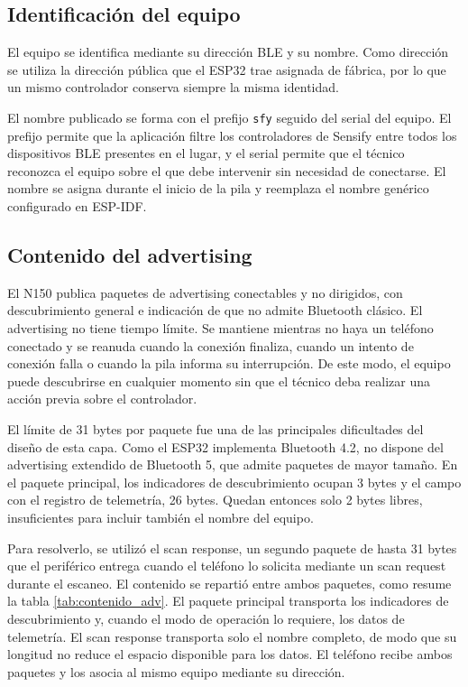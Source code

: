 \subsection{Identificación del equipo}
\label{subsec:gap_identificacion}

El equipo se identifica mediante su dirección BLE y su nombre. Como dirección se utiliza la dirección pública que el ESP32 trae asignada de fábrica, por lo que un mismo controlador conserva siempre la misma identidad.

El nombre publicado se forma con el prefijo \texttt{sfy} seguido del serial del equipo. El prefijo permite que la aplicación filtre los controladores de Sensify entre todos los dispositivos BLE presentes en el lugar, y el serial permite que el técnico reconozca el equipo sobre el que debe intervenir sin necesidad de conectarse. El nombre se asigna durante el inicio de la pila y reemplaza el nombre genérico configurado en ESP-IDF.

\subsection{Contenido del advertising}
\label{subsec:gap_contenido}

El N150 publica paquetes de advertising conectables y no dirigidos, con descubrimiento general e indicación de que no admite Bluetooth clásico. El advertising no tiene tiempo límite. Se mantiene mientras no haya un teléfono conectado y se reanuda cuando la conexión finaliza, cuando un intento de conexión falla o cuando la pila informa su interrupción. De este modo, el equipo puede descubrirse en cualquier momento sin que el técnico deba realizar una acción previa sobre el controlador.

El límite de 31 bytes por paquete fue una de las principales dificultades del diseño de esta capa. Como el ESP32 implementa Bluetooth 4.2, no dispone del advertising extendido de Bluetooth 5, que admite paquetes de mayor tamaño. En el paquete principal, los indicadores de descubrimiento ocupan 3 bytes y el campo con el registro de telemetría, 26 bytes. Quedan entonces solo 2 bytes libres, insuficientes para incluir también el nombre del equipo.

Para resolverlo, se utilizó el scan response, un segundo paquete de hasta 31 bytes que el periférico entrega cuando el teléfono lo solicita mediante un scan request durante el escaneo. El contenido se repartió entre ambos paquetes, como resume la tabla \ref{tab:contenido_adv}. El paquete principal transporta los indicadores de descubrimiento y, cuando el modo de operación lo requiere, los datos de telemetría. El scan response transporta solo el nombre completo, de modo que su longitud no reduce el espacio disponible para los datos. El teléfono recibe ambos paquetes y los asocia al mismo equipo mediante su dirección.

